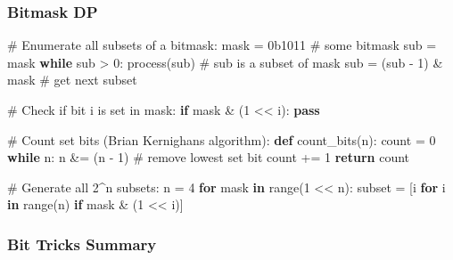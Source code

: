 \documentclass[11pt]{article}
\newenvironment{Shaded}{\begin{snugshade}}{\end{snugshade}}
\newcommand{\BaseNTok}[1]{\textcolor[rgb]{0.96,0.45,0.00}{#1}}
\newcommand{\BuiltInTok}[1]{\textcolor[rgb]{0.50,0.55,0.55}{#1}}
\newcommand{\CommentTok}[1]{\textcolor[rgb]{0.48,0.49,0.49}{#1}}
\newcommand{\ControlFlowTok}[1]{\textcolor[rgb]{0.99,0.74,0.29}{\textbf{#1}}}
\newcommand{\DecValTok}[1]{\textcolor[rgb]{0.96,0.45,0.00}{#1}}
\newcommand{\KeywordTok}[1]{\textcolor[rgb]{0.81,0.81,0.76}{\textbf{#1}}}
\newcommand{\NormalTok}[1]{\textcolor[rgb]{0.81,0.81,0.76}{#1}}
\newcommand{\OperatorTok}[1]{\textcolor[rgb]{0.81,0.81,0.76}{#1}}
\begin{document}
\subsubsection{Bitmask DP}\label{bitmask-dp}


\begin{Shaded}
\begin{Highlighting}[]
\CommentTok{\# Enumerate all subsets of a bitmask:}
\NormalTok{mask }\OperatorTok{=} \BaseNTok{0b1011}   \CommentTok{\# some bitmask}
\NormalTok{sub }\OperatorTok{=}\NormalTok{ mask}
\ControlFlowTok{while}\NormalTok{ sub }\OperatorTok{\textgreater{}} \DecValTok{0}\NormalTok{:}
\NormalTok{    process(sub)   }\CommentTok{\# sub is a subset of mask}
\NormalTok{    sub }\OperatorTok{=}\NormalTok{ (sub }\OperatorTok{{-}} \DecValTok{1}\NormalTok{) }\OperatorTok{\&}\NormalTok{ mask   }\CommentTok{\# get next subset}

\CommentTok{\# Check if bit i is set in mask:}
\ControlFlowTok{if}\NormalTok{ mask }\OperatorTok{\&}\NormalTok{ (}\DecValTok{1} \OperatorTok{\textless{}\textless{}}\NormalTok{ i):}
    \ControlFlowTok{pass}

\CommentTok{\# Count set bits (Brian Kernighan\textquotesingle{}s algorithm):}
\KeywordTok{def}\NormalTok{ count\_bits(n):}
\NormalTok{    count }\OperatorTok{=} \DecValTok{0}
    \ControlFlowTok{while}\NormalTok{ n:}
\NormalTok{        n }\OperatorTok{\&=}\NormalTok{ (n }\OperatorTok{{-}} \DecValTok{1}\NormalTok{)   }\CommentTok{\# remove lowest set bit}
\NormalTok{        count }\OperatorTok{+=} \DecValTok{1}
    \ControlFlowTok{return}\NormalTok{ count}

\CommentTok{\# Generate all 2\^{}n subsets:}
\NormalTok{n }\OperatorTok{=} \DecValTok{4}
\ControlFlowTok{for}\NormalTok{ mask }\KeywordTok{in} \BuiltInTok{range}\NormalTok{(}\DecValTok{1} \OperatorTok{\textless{}\textless{}}\NormalTok{ n):}
\NormalTok{    subset }\OperatorTok{=}\NormalTok{ [i }\ControlFlowTok{for}\NormalTok{ i }\KeywordTok{in} \BuiltInTok{range}\NormalTok{(n) }\ControlFlowTok{if}\NormalTok{ mask }\OperatorTok{\&}\NormalTok{ (}\DecValTok{1} \OperatorTok{\textless{}\textless{}}\NormalTok{ i)]}
\end{Highlighting}
\end{Shaded}

\subsubsection{Bit Tricks Summary}\label{bit-tricks-summary}
\end{document}
